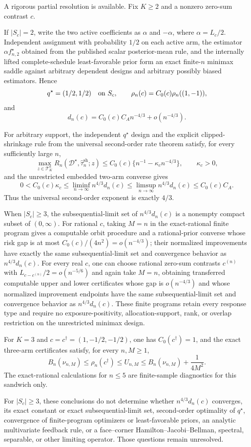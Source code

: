 A rigorous partial resolution is available. Fix \(K\geq2\) and a nonzero zero-sum contrast \(c\).

If \(|S_c|=2\), write the two active coefficients as \(\alpha\) and \(-\alpha\), where \(\alpha=L_c/2\). Independent assignment with probability \(1/2\) on each active arm, the estimator \(\alpha f_{n,2}^\star\) obtained from the published scalar posterior-mean rule, and the internally lifted complete-schedule least-favorable prior form an exact finite-\(n\) minimax saddle against arbitrary dependent designs and arbitrary possibly biased estimators. Hence
\[
 q^\star=(1/2,1/2)\quad\hbox{on }S_c,
 \qquad
 \rho_n(c)=C_0(c)\rho_n((1,-1)),
\]
and
\[
 d_n(c)=C_0(c)C_A n^{-4/3}+o(n^{-4/3}).
\]

For arbitrary support, the independent \(q^\star\) design and the explicit clipped-shrinkage rule from the universal second-order rate theorem satisfy, for every sufficiently large \(n\),
\[
 \max_{z\in\mathcal T_K^n}
 R_n(\mathcal D^\star,\widehat\tau_n^{\mathrm{sh}};z)
 \leq C_0(c)\{n^{-1}-\kappa_c n^{-4/3}\},
 \qquad \kappa_c>0,
\]
and the unrestricted embedded two-arm converse gives
\[
 0<C_0(c)\kappa_c
 \leq\liminf_{n\to\infty}n^{4/3}d_n(c)
 \leq\limsup_{n\to\infty}n^{4/3}d_n(c)
 \leq C_0(c)C_A.
\]
Thus the universal second-order exponent is exactly \(4/3\).

When \(|S_c|\geq3\), the subsequential-limit set of \(n^{4/3}d_n(c)\) is a nonempty compact subset of \((0,\infty)\). For rational \(c\), taking \(M=n\) in the exact-rational finite program gives a computable orbit procedure and a rational-prior converse whose risk gap is at most \(C_0(c)/(4n^2)=o(n^{-4/3})\); their normalized improvements have exactly the same subsequential-limit set and convergence behavior as \(n^{4/3}d_n(c)\). For every real \(c\), one can choose rational zero-sum contrasts \(c^{(n)}\) with \(L_{c-c^{(n)}}/2=o(n^{-5/6})\) and again take \(M=n\), obtaining transferred computable upper and lower certificates whose gap is \(o(n^{-4/3})\) and whose normalized improvement endpoints have the same subsequential-limit set and convergence behavior as \(n^{4/3}d_n(c)\). These finite programs retain every response type and require no exposure-positivity, allocation-support, rank, or overlap restriction on the unrestricted minimax design.

For \(K=3\) and \(c=c^\dagger=(1,-1/2,-1/2)\), one has \(C_0(c^\dagger)=1\), and the exact three-arm certificates satisfy, for every \(n,M\geq1\),
\[
 B_n(\nu_{n,M})\leq\rho_n(c^\dagger)\leq U_{n,M}
 \leq B_n(\nu_{n,M})+\frac{1}{4M^2}.
\]
The exact-rational calculations for \(n\leq5\) are finite-sample diagnostics for this sandwich only.

For \(|S_c|\geq3\), these conclusions do not determine whether \(n^{4/3}d_n(c)\) converges, its exact constant or exact subsequential-limit set, second-order optimality of \(q^\star\), convergence of finite-program optimizers or least-favorable priors, an analytic multivariate feedback rule, or a face--corner Hamilton--Jacobi--Bellman, spectral, separable, or other limiting operator. Those questions remain unresolved.